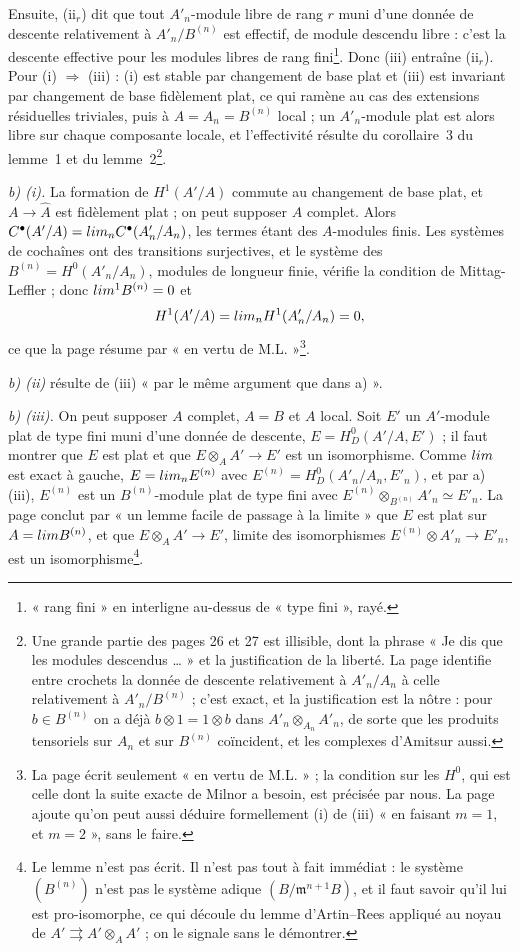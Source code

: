 \documentclass[11pt,a4paper]{article}
\begin{document}
Ensuite, (ii$_r$) dit que tout $A'_n$-module libre de rang $r$ muni d'une
donnée de descente relativement à $A'_n/B^{(n)}$ est effectif, de module
descendu libre : c'est la descente effective pour les modules libres de rang
fini\footnote{« rang fini » en interligne au-dessus de « type fini »,
rayé.}. Donc (iii) entraîne (ii$_r$). Pour (i) $\Rightarrow$ (iii) : (i) est
stable par changement de base plat et (iii) est invariant par changement de
base fidèlement plat, ce qui ramène au cas des extensions résiduelles
triviales, puis à $A = A_n = B^{(n)}$ local ; un $A'_n$-module plat est alors
libre sur chaque composante locale, et l'effectivité résulte du
corollaire~3 du lemme~1 et du lemme~2\footnote{Une grande partie des pages 26
et 27 est illisible, dont la phrase « Je dis que les modules descendus … » et
la justification de la liberté. La page identifie entre crochets la donnée de
descente relativement à $A'_n/A_n$ à celle relativement à $A'_n/B^{(n)}$ ;
c'est exact, et la justification est la nôtre : pour $b \in B^{(n)}$ on a déjà
$b \otimes 1 = 1 \otimes b$ dans $A'_n \otimes_{A_n} A'_n$, de sorte que les
produits tensoriels sur $A_n$ et sur $B^{(n)}$ coïncident, et les complexes
d'Amitsur aussi.}.

\emph{b) (i).} La formation de $H^1(A'/A)$ commute au changement de base
plat, et $A \to \widehat{A}$ est fidèlement plat ; on peut supposer $A$
complet. Alors $C^{\bullet}(A'/A) = \varprojlim_n C^{\bullet}(A'_n/A_n)$,
les termes étant des $A$-modules finis. Les systèmes de cochaînes ont des
transitions surjectives, et le système des $B^{(n)} = H^0(A'_n/A_n)$,
modules de longueur finie, vérifie la condition de Mittag-Leffler ; donc
$\varprojlim^1 B^{(n)} = 0$ et
\[
  H^1(A'/A) = \varprojlim_n H^1(A'_n/A_n) = 0 ,
\]
ce que la page résume par « en vertu de M.L. »\footnote{La page écrit seulement « en vertu de M.L. » ; la condition sur
les $H^0$, qui est celle dont la suite exacte de Milnor a besoin, est
précisée par nous. La page ajoute qu'on peut aussi déduire formellement (i)
de (iii) « en faisant $m = 1$, et $m = 2$ », sans le faire.}.

\emph{b) (ii)} résulte de (iii) « par le même argument que dans a) ».

\emph{b) (iii).} On peut supposer $A$ complet, $A = B$ et $A$ local. Soit
$E'$ un $A'$-module plat de type fini muni d'une donnée de descente, $E =
H^0_D(A'/A, E')$ ; il faut montrer que $E$ est plat et que $E \otimes_A A'
\to E'$ est un isomorphisme. Comme $\varprojlim$ est exact à gauche, $E =
\varprojlim_n E^{(n)}$ avec $E^{(n)} = H^0_D(A'_n/A_n, E'_n)$, et par a)
(iii), $E^{(n)}$ est un $B^{(n)}$-module plat de type fini avec $E^{(n)}
\otimes_{B^{(n)}} A'_n \simeq E'_n$. La page conclut par « un lemme facile de
passage à la limite » que $E$ est plat sur $A = \varprojlim B^{(n)}$, et que
$E \otimes_A A' \to E'$, limite des isomorphismes $E^{(n)} \otimes A'_n \to
E'_n$, est un isomorphisme\footnote{Le lemme n'est pas écrit. Il n'est pas
tout à fait immédiat : le système $(B^{(n)})$ n'est pas le système adique
$(B/\mathfrak{m}^{n+1}B)$, et il faut savoir qu'il lui est
pro-isomorphe, ce qui découle du lemme d'Artin–Rees appliqué au noyau de
$A' \rightrightarrows A' \otimes_A A'$ ; on le signale sans le
démontrer.}.
\end{document}
